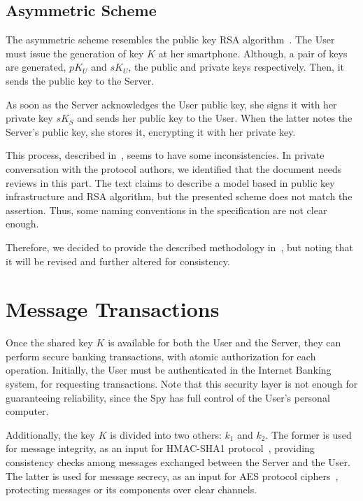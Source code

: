 \subsection{Asymmetric Scheme}
The asymmetric scheme resembles the public key RSA algorithm~\cite{RSA}. The User must issue the generation of key \(K\) at her smartphone. Although, a pair of keys are generated, \(pK_U\) and \(sK_U\), the public and private keys respectively. Then, it sends the public key to the Server.

As soon as the Server acknowledges the User public key, she signs it with her private key \(sK_S\) and sends her public key to the User. When the latter notes the Server's public key, she stores it, encrypting it with her private key.

This process, described in~\cite[p.78]{Peotta2012}, seems to have some inconsistencies. In private conversation with the protocol authors, we identified that the document needs reviews in this part. The text claims to describe a model based in public key infrastructure and RSA algorithm, but the presented scheme does not match the assertion. Thus, some naming conventions in the specification are not clear enough.

Therefore, we decided to provide the described methodology in~\cite{Peotta2012}, but noting that it will be revised and further altered for consistency.





\section{Message Transactions}
Once the shared key \(K\) is available for both the User and the Server, they can perform secure banking transactions, with atomic authorization for each operation. Initially, the User must be authenticated in the Internet Banking system, for requesting transactions. Note that this security layer is not enough for guaranteeing reliability, since the Spy has full control of the User's personal computer.

Additionally, the key \(K\) is divided into two others: \(k_1\) and \(k_2\). The former is used for message integrity, as an input for HMAC-SHA1 protocol~\cite{Bellare96}, providing consistency checks among messages exchanged between the Server and the User. The latter is used for message secrecy, as an input for AES protocol ciphers~\cite{AES}, protecting messages or its components over clear channels.

